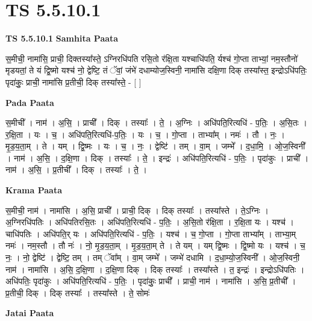\documentclass[17pt]{extarticle}
\begin{document}
\section{ TS 5.5.10.1 }

\textbf{TS 5.5.10.1 } \newline
\textbf{Samhita Paata} \newline

स॒॒मीची॒॒ नामा॑सि॒ प्राची॒ दिक्तस्या᳚स्ते॒ ऽग्निरधि॑पति रसि॒तो र॑क्षि॒ता यश्चाधि॑पति॒ र्यश्च॑ गो॒प्ता ताभ्यां॒ नम॒स्तौनो॑ मृडयतां॒ ते यं द्वि॒ष्मो यश्च॑ नो॒ द्वेष्टि॒ तं ॅवां॒ जंभे॑ दधाम्योज॒स्विनी॒ नामा॑सि दक्षि॒णा दिक् तस्या᳚स्त॒ इन्द्रोऽधि॑पतिः॒ पृदा॑कुः॒ प्राची॒ नामा॑सि प्र॒तीची॒ दिक् तस्या᳚स्ते॒ - [  ] \newline

\textbf{Pada Paata} \newline

स॒मीची᳚ । नाम॑ । अ॒सि॒ । प्राची᳚ । दिक् । तस्याः᳚ । ते॒ । अ॒ग्निः । अधि॑पति॒रित्यधि॑ - प॒तिः॒ । अ॒सि॒तः । र॒क्षि॒ता । यः । च॒ । अधि॑पति॒रित्यधि॑-प॒तिः॒ । यः । च॒ । गो॒प्ता । ताभ्या᳚म् । नमः॑ । तौ । नः॒ । मृ॒ड॒य॒ता॒म् । ते । यम् । द्वि॒ष्मः । यः । च॒ । नः॒ । द्वेष्टि॑ । तम् । वा॒म् । जम्भे᳚ । द॒धा॒मि॒ । ओ॒ज॒स्विनी᳚ । नाम॑ । अ॒सि॒ । द॒क्षि॒णा । दिक् । तस्याः᳚ । ते॒ । इन्द्रः॑ । अधि॑पति॒रित्यधि॑ - प॒तिः॒ । पृदा॑कुः । प्राची᳚ । नाम॑ । अ॒सि॒ । प्र॒तीची᳚ । दिक् । तस्याः᳚ । ते॒ ।  \newline


\textbf{Krama Paata} \newline

स॒मीची॒ नाम॑ । नामा॑सि । अ॒सि॒ प्राची᳚ । प्राची॒ दिक् । दिक् तस्याः᳚ । तस्या᳚स्ते । ते॒ऽग्निः । अ॒ग्निरधि॑पतिः । अधि॑पतिरसि॒तः । अधि॑पति॒रित्यधि॑ - प॒तिः॒ । अ॒सि॒तो र॑क्षि॒ता । र॒क्षि॒ता यः । यश्च॑ । चाधि॑पतिः । अधि॑पति॒र् यः । अधि॑पति॒रित्यधि॑ - प॒तिः॒ । यश्च॑ । च॒ गो॒प्ता । गो॒प्ता ताभ्या᳚म् । ताभ्या॒म् नमः॑ । नम॒स्तौ । तौ नः॑ । नो॒ मृ॒ड॒य॒ता॒म् । मृ॒ड॒य॒ता॒म् ते । ते यम् । यम् द्वि॒ष्मः । द्वि॒ष्मो यः । यश्च॑ । च॒ नः॒ । नो॒ द्वेष्टि॑ । द्वेष्टि॒ तम् । तम् ॅवा᳚म् । वा॒म् जम्भे᳚ । जम्भे॑ दधामि । द॒धा॒म्यो॒ज॒स्विनी᳚ । ओ॒ज॒स्विनी॒ नाम॑ । नामा॑सि । अ॒सि॒ द॒क्षि॒णा । द॒क्षि॒णा दिक् । दिक् तस्याः᳚ । तस्या᳚स्ते । त॒ इन्द्रः॑ । इन्द्रोऽधि॑पतिः । अधि॑पतिः॒ पृदा॑कुः । अधि॑पति॒रित्यधि॑ - प॒तिः॒ । पृदा॑कुः॒ प्राची᳚ । प्राची॒ नाम॑ । नामा॑सि । अ॒सि॒ प्र॒तीची᳚ । प्र॒तीची॒ दिक् । दिक् तस्याः᳚ । तस्या᳚स्ते । ते॒ सोमः॑ \newline

\textbf{Jatai Paata} \newline
\end{document}
